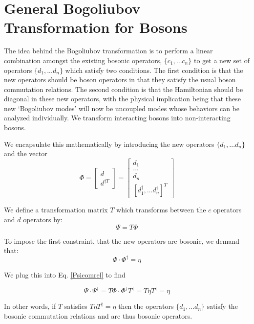 \documentclass[12pt]{article}
\begin{document}
\section{General Bogoliubov Transformation for Bosons}
The idea behind the Bogoliubov transformation is to perform a linear combination amongst the existing bosonic operators, $\{c_1, ... c_n\}$ to get a new set of operators  $\{d_1, ... d_n\}$ which satisfy two conditions. The first condition is that the new operators should be boson operators in that they satisfy the usual boson commutation relations. The second condition is that the Hamiltonian should be diagonal in these new operators, with the physical implication being that these new `Bogoliubov modes' will now be uncoupled modes whose behaviors can be analyzed individually. We transform interacting bosons into non-interacting bosons.

We encapsulate this mathematically by introducing the new operators $\{d_1, ... d_n\}$ and the vector 
\begin{equation}\Phi = 
\begin{bmatrix}
d \\
d^{\dag T}
\end{bmatrix} = 
\begin{bmatrix}
d_1\\
...\\
d_n\\
[d_1^{\dagger}, ... d_n^{\dagger}]^T
\end{bmatrix}
\end{equation}

We define a transformation matrix $T$ which transforms between the $c$ operators and $d$ operators by:
\begin{equation} \Psi = T \Phi\end{equation}

To impose the first constraint, that the new operators are bosonic, we demand that:
\begin{equation} \Phi \cdot \Phi^\dag = \eta\end{equation}

We plug this into Eq. \ref{Psicomrel} to find

\begin{equation} \label{etaeq} \Psi \cdot \Psi^{\dagger} = T \Phi \cdot \Phi^{\dagger} T^{\dagger} = T \eta T^{\dagger} = \eta \end{equation}

In other words, if $T$ satisfies $T \eta T^{\dagger} = \eta$ then the operators $\{d_1, ... d_n\}$ satisfy the bosonic commutation relations and are thus bosonic operators.
\end{document}
